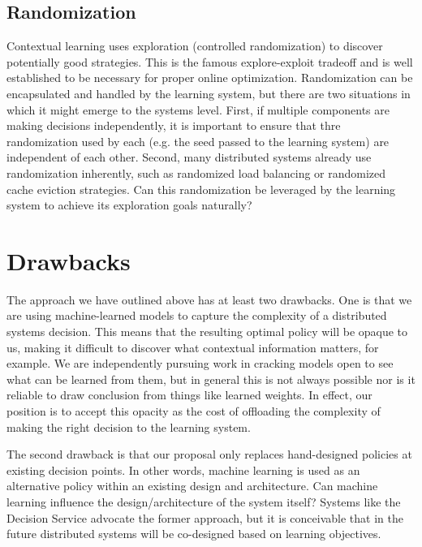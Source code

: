 \documentclass[a4paper,twocolumn]{article}
\newcommand{\ignore}[1]{}
\begin{document}
\subsection*{Randomization}

Contextual learning uses exploration (controlled randomization) to discover
potentially good strategies. This is the famous explore-exploit tradeoff and is
well established to be necessary for proper online optimization. Randomization
can be encapsulated and handled by the learning system, but there are two
situations in which it might emerge to the systems level. First, if multiple
components are making decisions independently, it is important to ensure that
thre randomization used by each (e.g. the seed passed to the learning system)
are independent of each other. Second, many distributed systems already use
randomization inherently, such as randomized load balancing or randomized cache
eviction strategies. Can this randomization be leveraged by the learning
system to achieve its exploration goals naturally?

\ignore{
An ML agent can be trained offline with pre-labeled data. However, is this
possible in the context of distributed systems? An online learning systems is
more logical in this context, however, how do we quantify the costs of
exploration vs exploitation of learned strategies?
}

\section{Drawbacks}

The approach we have outlined above has at least two drawbacks. One is that we
are using machine-learned models to capture the complexity of a distributed
systems decision. This means that the resulting optimal policy will be opaque to
us, making it difficult to discover what contextual information matters, for
example.  We are independently pursuing work in cracking models open to see what
can be learned from them, but in general this is not always possible nor is it
reliable to draw conclusion from things like learned weights. In effect, our
position is to accept this opacity as the cost of offloading the complexity of
making the right decision to the learning system.

The second drawback is that our proposal only replaces hand-designed policies at
existing decision points. In other words, machine learning is used as an
alternative policy within an existing design and architecture. Can machine
learning influence the design/architecture of the system itself? Systems like
the Decision Service advocate the former approach, but it is conceivable that in
the future distributed systems will be co-designed based on learning objectives.
\end{document}
